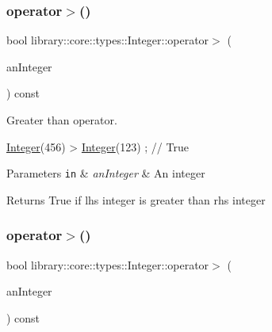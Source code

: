 \subsubsection{\texorpdfstring{operator$>$()}{operator>()}\hspace{0.1cm}{\footnotesize\ttfamily [1/2]}}
{\footnotesize\ttfamily bool library\+::core\+::types\+::\+Integer\+::operator$>$ (\begin{DoxyParamCaption}\item[{const \hyperlink{classlibrary_1_1core_1_1types_1_1_integer}{Integer} \&}]{an\+Integer }\end{DoxyParamCaption}) const}



Greater than operator. 


\begin{DoxyCode}
\hyperlink{classlibrary_1_1core_1_1types_1_1_integer_a6483b1c4e13e5ed6af5e7a58347efead}{Integer}(456) > \hyperlink{classlibrary_1_1core_1_1types_1_1_integer_a6483b1c4e13e5ed6af5e7a58347efead}{Integer}(123) ; \textcolor{comment}{// True}
\end{DoxyCode}



\begin{DoxyParams}[1]{Parameters}
\mbox{\tt in}  & {\em an\+Integer} & An integer \\
\hline
\end{DoxyParams}
\begin{DoxyReturn}{Returns}
True if lhs integer is greater than rhs integer 
\end{DoxyReturn}
\mbox{\label{classlibrary_1_1core_1_1types_1_1_integer_a1e0736e7d215b2ad2e7291a983490bf5}} 
\subsubsection{\texorpdfstring{operator$>$()}{operator>()}\hspace{0.1cm}{\footnotesize\ttfamily [2/2]}}
{\footnotesize\ttfamily bool library\+::core\+::types\+::\+Integer\+::operator$>$ (\begin{DoxyParamCaption}\item[{const \hyperlink{classlibrary_1_1core_1_1types_1_1_integer_a623afb1580f870fd8a1997b1c12c917d}{Integer\+::\+Value\+Type} \&}]{an\+Integer }\end{DoxyParamCaption}) const}

